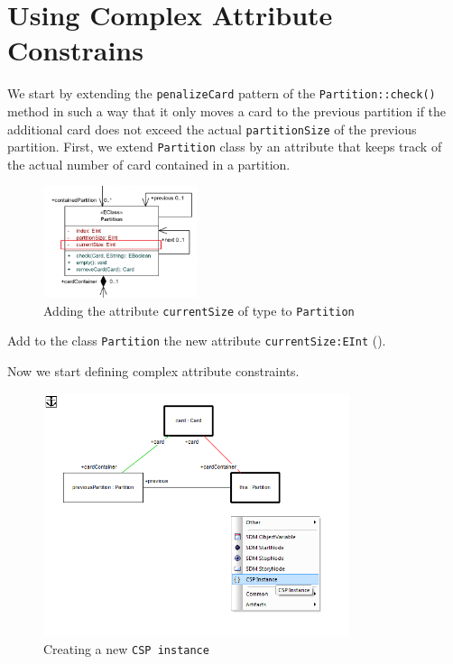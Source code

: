 \section{Using Complex Attribute Constrains}     
We start by extending the \texttt{penalizeCard} pattern of the \texttt{Partition::check()} method in such a way that it only moves a card to the previous partition if the additional card does not exceed the actual \texttt{partitionSize} of the previous partition.
First, we extend \texttt{Partition} class by an attribute that keeps track of the actual number of card contained in a partition.
\begin{figure}[htbp]
\begin{center}
  \includegraphics[width=0.4\textwidth]{../../org.moflon.doc.handbook.03_storyDiagrams/13_complexAttributeConstraints/visCACImages/ea_CAC_newAtributes}
  \caption{Adding the attribute \texttt{currentSize} of type  to \texttt{Partition}}  
  \label{ea_CAC_newAtributes}
\end{center}
\end{figure}
%
\begin{stepbystep}    
\item Add to the class \texttt{Partition} the new attribute \texttt{currentSize:EInt} ().
\end{stepbystep} 
%
Now we start defining complex attribute constraints.
\begin{figure}[htbp]
\begin{center}
  \includegraphics[width=0.8\textwidth]{../../org.moflon.doc.handbook.03_storyDiagrams/13_complexAttributeConstraints/visCACImages/ea_CAC_NewCSP}
  \caption{Creating a new \texttt{CSP instance}}  
  \label{ea:CAC_NewCSP}
\end{center}
\end{figure}
